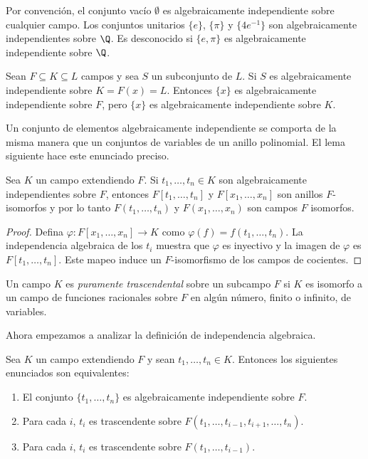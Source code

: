 \begin{example}
  Por convención, el conjunto vacío $\emptyset$ es algebraicamente independiente sobre cualquier campo. Los conjuntos unitarios $\{e\}$, $\{\pi\}$ y $\{4e^{-1}\}$ son algebraicamente independientes sobre $\Q$. Es desconocido si $\{e, \pi\}$ es algebraicamente independiente sobre $\Q$.
\end{example}

\begin{example}
  Sean $F \subseteq K \subseteq L$ campos y sea $S$ un subconjunto de $L$. Si $S$ es algebraicamente independiente sobre $K = F(x) = L$. Entonces $\{x\}$ es algebraicamente independiente sobre $F$, pero $\{x\}$ es algebraicamente independiente sobre $K$.
\end{example}

Un conjunto de elementos algebraicamente independiente se comporta de la misma manera que un conjuntos de variables de un anillo polinomial. El lema siguiente hace este enunciado preciso.

\begin{lemma}\label{lemma:2.1.5}
  Sea $K$ un campo extendiendo $F$. Si $t_1, \ldots, t_n \in K$ son algebraicamente independientes sobre $F$, entonces $F[t_1, \ldots, t_n]$ y $F[x_1, \ldots, x_n]$ son anillos $F$-isomorfos y por lo tanto $F(t_1,\ldots,t_n)$ y $F(x_1, \ldots, x_n)$ son campos $F$ isomorfos.
\end{lemma}

\begin{proof}
  Defina $\varphi\colon F[x_1, \ldots, x_n] \to K$ como $\varphi(f) = f(t_1, \ldots, t_n)$. La independencia algebraica de los $t_i$ muestra que $\varphi$ es inyectivo y la imagen de $\varphi$ es $F[t_1, \ldots, t_n]$. Este mapeo induce un $F$-isomorfismo de los campos de cocientes.
\end{proof}

\begin{definition}
  Un campo $K$ es \emph{puramente trascendental} sobre un subcampo $F$ si $K$ es isomorfo a un campo de funciones racionales sobre $F$ en algún número, finito o infinito, de variables.
\end{definition}

Ahora empezamos a analizar la definición de independencia algebraica.

\begin{lemma}
  Sea $K$ un campo extendiendo $F$ y sean $t_1, \ldots, t_n \in K$. Entonces los siguientes enunciados son equivalentes:
  \begin{enumerate}
    \item El conjunto $\{t_1, \ldots, t_n\}$ es algebraicamente independiente sobre $F$.
    \item Para cada $i$, $t_i$ es trascendente sobre $F(t_1,\ldots,t_{i-1}, t_{i+1}, \ldots, t_n)$.
    \item Para cada $i$, $t_i$ es trascendente sobre $F(t_1, \ldots, t_{i-1})$.
  \end{enumerate}
\end{lemma}

